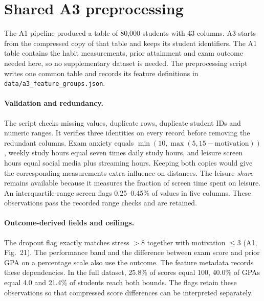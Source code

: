 \section{Shared A3 preprocessing}
\label{sec:a3-prep}

The A1 pipeline produced a table of 80,000 students with 43 columns. A3 starts
from the compressed copy of that table and keeps its student identifiers.
The A1 table contains the habit measurements, prior attainment and exam
outcome needed here, so no supplementary dataset is needed. The preprocessing
script writes one common table and records its feature definitions in
\texttt{data/a3\_feature\_groups.json}.

\paragraph{Validation and redundancy.}
The script checks missing values, duplicate rows, duplicate student IDs and
numeric ranges. It verifies three identities on every record before removing
the redundant columns. Exam anxiety equals $\min(10,\max(5,15-\mathrm{motivation}))$,
weekly study hours equal seven times daily study hours, and leisure screen
hours equal social media plus streaming hours. Keeping both copies would
give the corresponding measurements extra influence on distances. The
leisure \emph{share} remains available because it measures the fraction
of screen time spent on leisure. An interquartile-range screen flags
0.25--0.45\% of values in five columns. These observations pass the recorded
range checks and are retained.

\paragraph{Outcome-derived fields and ceilings.}
The dropout flag exactly matches stress $>8$ together with motivation $\leq3$
(A1, Fig.~21). The performance band and the difference between exam score
and prior GPA on a percentage scale also use the outcome. The feature
metadata records these dependencies. In the full dataset, 25.8\% of scores
equal 100, 40.0\% of GPAs equal 4.0 and 21.4\% of students reach both
bounds. The flags retain these observations so that compressed score
differences can be interpreted separately.

